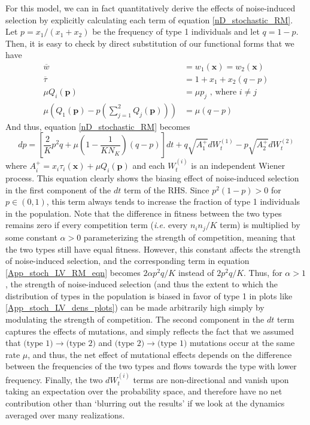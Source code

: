For this model, we can in fact quantitatively derive the effects of noise-induced selection by explicitly calculating each term of equation \eqref{nD_stochastic_RM}. Let $p = x_1/(x_1 + x_2)$ be the frequency of type 1 individuals and let $q = 1-p$. Then, it is easy to check by direct substitution of our functional forms that we have
\begin{align*}
	\overline{w} &= w_1(\mathbf{x}) = w_2(\mathbf{x})\\
	\overline{\tau} &= 1 + x_1 + x_2(q-p)\\
	\mu Q_i(\mathbf{p}) &= \mu p_{j}\textrm{ , where $i \neq j$}\\
	\mu(Q_1(\mathbf{p}) - p\left(\sum\limits_{j=1}^{2} Q_j(\mathbf{p})\right)) &= \mu(q-p)
\end{align*}
And thus, equation \eqref{nD_stochastic_RM} becomes
\begin{equation}
	\label{App_stoch_LV_RM_eqn}
	dp =  \left[\frac{2}{K}p^2q + \mu\left(1-\frac{1}{KN_K}\right)\left(q-p\right)\right]dt + q\sqrt{A^{+}_1}dW_t^{(1)} - p\sqrt{A^{+}_2}dW_t^{(2)}
\end{equation}
where $A_i^{+} = x_i\tau_i(\mathbf{x}) +\mu Q_i(\mathbf{p})$ and each $W^{(i)}_t$ is an independent Wiener process. This equation clearly shows the biasing effect of noise-induced selection in the first component of the $dt$ term of the RHS. Since $p^2(1-p) > 0$ for $p \in (0,1)$, this term always tends to increase the fraction of type 1 individuals in the population. Note that the difference in fitness between the two types remains zero if every competition term (\emph{i.e.} every $n_in_j/K$ term) is multiplied by some constant $\alpha > 0$ parameterizing the strength of competition, meaning that the two types still have equal fitness. However, this constant affects the strength of noise-induced selection, and the corresponding term in equation \ref{App_stoch_LV_RM_eqn} becomes $2\alpha p^2q/K$ instead of $2p^2q/K$. Thus, for $\alpha > 1$, the strength of noise-induced selection (and thus the extent to which the distribution of types in the population is biased in favor of type 1 in plots like \ref{App_stoch_LV_dens_plots}) can be made arbitrarily high simply by modulating the strength of competition. The second component in the $dt$ term captures the effects of mutations, and simply reflects the fact that we assumed that $\textrm{(type }1) \to \textrm{(type }2)$ and $\textrm{(type }2) \to \textrm{(type }1)$ mutations occur at the same rate $\mu$, and thus, the net effect of mutational effects depends on the difference between the frequencies of the two types and flows towards the type with lower frequency. Finally, the two $dW^{(i)}_t$ terms are non-directional and vanish upon taking an expectation over the probability space, and therefore have no net contribution other than `blurring out the results' if we look at the dynamics averaged over many realizations.

